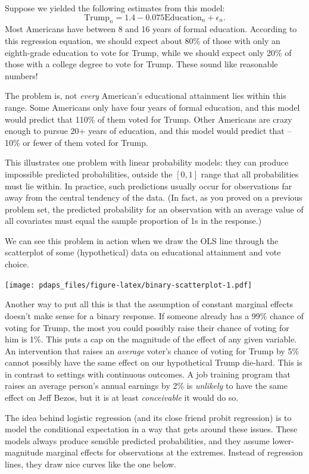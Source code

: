 \documentclass[12pt,oneside,openany]{book}
\begin{document}
Suppose we yielded the following estimates from this model: \[
\text{Trump}_n = 1.4 - 0.075 \text{Education}_n + \epsilon_n.
\] Most Americans have between 8 and 16 years of formal education.
According to this regression equation, we should expect about 80\% of
those with only an eighth-grade education to vote for Trump, while we
should expect only 20\% of those with a college degree to vote for
Trump. These sound like reasonable numbers!

The problem is, not \emph{every} American's educational attainment lies
within this range. Some Americans only have four years of formal
education, and this model would predict that 110\% of them voted for
Trump. Other Americans are crazy enough to pursue 20+ years of
education, and this model would predict that --10\% or fewer of them
voted for Trump.

This illustrates one problem with linear probability models: they can
produce impossible predicted probabilities, outside the \([0, 1]\) range
that all probabilities must lie within. In practice, such predictions
usually occur for observations far away from the central tendency of the
data. (In fact, as you proved on a previous problem set, the predicted
probability for an observation with an average value of all covariates
must equal the sample proportion of 1s in the response.)

We can see this problem in action when we draw the OLS line through the
scatterplot of some (hypothetical) data on educational attainment and
vote choice.

\texttt{[image: pdaps\_files/figure-latex/binary-scatterplot-1.pdf]}

Another way to put all this is that the assumption of constant marginal
effects doesn't make sense for a binary response. If someone already has
a 99\% chance of voting for Trump, the most you could possibly raise
their chance of voting for him is 1\%. This puts a cap on the magnitude
of the effect of any given variable. An intervention that raises an
\emph{average} voter's chance of voting for Trump by 5\% cannot possibly
have the same effect on our hypothetical Trump die-hard. This is in
contrast to settings with continuous outcomes. A job training program
that raises an average person's annual earnings by 2\% is
\emph{unlikely} to have the same effect on Jeff Bezos, but it is at
least \emph{conceivable} it would do so.

The idea behind logistic regression (and its close friend probit
regression) is to model the conditional expectation in a way that gets
around these issues. These models always produce sensible predicted
probabilities, and they assume lower-magnitude marginal effects for
observations at the extremes. Instead of regression lines, they draw
nice curves like the one below.
\end{document}
